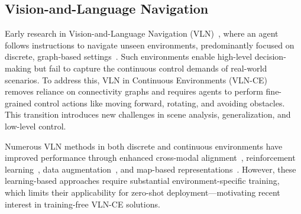 \documentclass[letterpaper, 10 pt, conference]{ieeeconf}
\begin{document}
\subsection{Vision-and-Language Navigation}
Early research in Vision-and-Language Navigation (VLN)~\cite{anderson2018vision}, where an agent follows instructions to navigate unseen environments, predominantly focused on discrete, graph-based settings~\cite{chang2017matterport3d, qi2020reverie, ku2020room}.
Such environments enable high-level decision-making but fail to capture the continuous control demands of real-world scenarios.
To address this, VLN in Continuous Environments (VLN-CE)~\cite{krantz_vlnce_2020} removes reliance on connectivity graphs and requires agents to perform fine-grained control actions like moving forward, rotating, and avoiding obstacles.
This transition introduces new challenges in scene analysis, generalization, and low-level control.

Numerous VLN methods in both discrete and continuous environments have improved performance through enhanced cross-modal alignment~\cite{hong2021vln, qi2021road}, reinforcement learning~\cite{wang2019reinforced}, data augmentation~\cite{Li2022EnveditEE, fried2018speaker, wang2023scaling, mei2025urbannav}, and map-based representations~\cite{chen2022duet, an2024etpnav, wang2023gridmm}.
However, these learning-based approaches require substantial environment-specific training, which limits their applicability for zero-shot deployment—motivating recent interest in training-free VLN-CE solutions.


\end{document}
